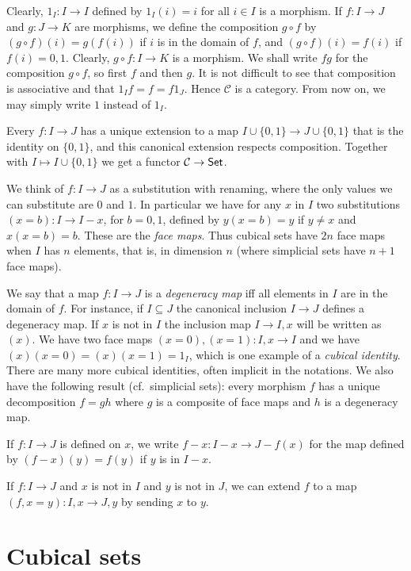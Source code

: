 \documentclass[10pt,a4paper]{article}
\newcommand{\CC}{{\mathcal C}}
\newcommand{\set}[1]{\{#1\}}
\begin{document}
Clearly, $1_I : I\to I$ defined by $1_I(i) = i$ for all $i\in I$ is a morphism.
If $f:I\to J$ and $g:J\to K$ are morphisms, we define the composition $g\circ f$ by
$(g\circ f)(i) = g(f(i))$ if $i$ is in the domain of $f$, and $(g\circ f)(i) = f(i)$ if $f(i)= 0,1$.
Clearly, $g\circ f: I\to K$ is a morphism.
We shall write $fg$ for the composition $g\circ f$, so first $f$ and then $g$.
It is not difficult to see that composition is associative and that $1_I f = f = f 1_J$.
Hence $\CC$ is a category. From now on, we may simply write $1$ instead of $1_I$.

Every $f:I\to J$ has a unique extension to a map $I \cup \set{0,1} \to J\cup \set{0,1}$
that is the identity on $\set{0,1}$, and this canonical extension respects composition.
Together with $I\mapsto I \cup \set{0,1}$ we get a functor $\CC\to{\sf Set}$.

 We think of $f:I\to J$ as a substitution with renaming,
 where the only values we can substitute are $0$ and $1$.
In particular we have for any $x$ in $I$ two substitutions $(x=b):I\to I-x$, for $b=0,1$,
defined by $y(x=b) = y$ if $y\neq x$ and $x(x=b) = b$. These are the \emph{face maps}.
Thus cubical sets have $2n$ face maps when $I$ has $n$ elements, that is, in dimension $n$
(where simplicial sets have $n+1$ face maps).

 We say that a map $f:I\to J$ is a {\em degeneracy map} if{f} all elements in $I$ are in
the domain of $f$. For instance, if $I\subseteq J$ the canonical inclusion $I \to J$ defines
a degeneracy map. If $x$ is not in $I$ the inclusion map $I \to I,x$ will be written as $(x)$.
We have two face maps $(x=0), (x=1):I,x\to I$ and we
have $(x)(x=0) = (x)(x=1) = 1_I$, which is one example of a \emph{cubical identity}.
There are many more cubical identities, often implicit in the notations. We also have
the following result (cf.\ simplicial sets): every morphism $f$ has a unique decomposition
$f=gh$ where $g$ is a composite of face maps and $h$ is a degeneracy map.

 If $f:I\to J$ is defined on $x$, we write $f-x:I-x \to J-{f(x)}$ for the map defined by
$(f-x)(y) = f(y)$ if $y$ is in $I-x.$

If $f:I\to J$ and $x$ is not in $I$ and $y$ is not in $J$, we can
extend $f$ to a map $(f,x=y):I,x\to J,y$ by sending $x$ to $y$.

\section{Cubical sets}
\end{document}
